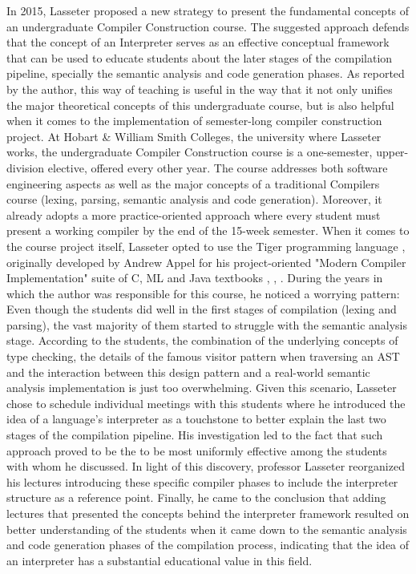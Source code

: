 In 2015, Lasseter \cite{lasseter2015interpreter} proposed a new strategy to present the fundamental concepts of an undergraduate Compiler Construction course. The suggested approach defends that the concept of an Interpreter serves as an effective conceptual framework that can be used to educate students about the later stages of the compilation pipeline, specially the semantic analysis and code generation phases. As reported by the author, this way of teaching is useful in the way that it not only unifies the major theoretical concepts of this undergraduate course, but is also helpful when it comes to the implementation of semester-long compiler construction project. At Hobart \& William Smith Colleges, the university where Lasseter works, the undergraduate Compiler Construction course is a one-semester, upper-division elective, offered every other year. The course addresses both software engineering aspects as well as the major concepts of a traditional Compilers course (lexing, parsing, semantic analysis and code generation). Moreover, it already adopts a more practice-oriented approach where every student must present a working compiler by the end of the 15-week semester. When it comes to the course project itself, Lasseter opted to use the Tiger programming language \cite{appel1998tiger}, originally developed by Andrew Appel for his project-oriented "Modern Compiler Implementation" suite of C, ML and Java textbooks \cite{appel1997modernCompilerImplementationC}, \cite{appel2002modernCompilerImplementationJava}, \cite{appel2004modernCompilerImplementationML}. During the years in which the author was responsible for this course, he noticed a worrying pattern: Even though the students did well in the first stages of compilation (lexing and parsing), the vast majority of them started to struggle with the semantic analysis stage. According to the students, the combination of the underlying concepts of type checking, the details of the famous visitor pattern when traversing an AST and the interaction between this design pattern and a real-world semantic analysis implementation is just too overwhelming. Given this scenario, Lasseter chose to schedule individual meetings with this students where he introduced the idea of a language's interpreter as a touchstone to better explain the last two stages of the compilation pipeline. His investigation led to the fact that such approach proved to be the to be most uniformly effective among the students with whom he discussed. In light of this discovery, professor Lasseter reorganized his lectures introducing these specific compiler phases to include the interpreter structure as a reference point. Finally, he came to the conclusion that adding lectures that presented the concepts behind the interpreter framework resulted on better understanding of the students when it came down to the semantic analysis and code generation phases of the compilation process, indicating that the idea of an interpreter has a substantial educational value in this field.


